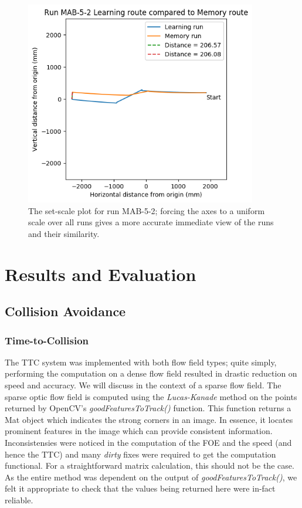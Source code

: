 \documentclass[a4paper,11pt,twoside,openright]{article}
\let\oldsection\section
\def\section{\cleardoublepage\oldsection}
\begin{document}
\begin{figure}
  \centering
  \includegraphics[width=0.9\textwidth]{MAB-5-2}
  \caption{\label{fig:setscalerun}The set-scale plot for run MAB-5-2; forcing the axes to a uniform scale over all runs gives a more accurate immediate
      view of the runs and their similarity.}
\end{figure}

\newpage

\section{ Results and Evaluation } \label{sec:results}
\subsection{Collision Avoidance}
\subsubsection{Time-to-Collision}
The TTC system was implemented with both flow field types; quite simply, performing the computation on a dense flow
field resulted in drastic reduction on speed and accuracy. We will discuss in the context of a sparse flow field. The
sparse optic flow field is computed using the \textit{Lucas-Kanade} method on the points returned by OpenCV's
\textit{goodFeaturesToTrack()} function. This function returns a Mat object which indicates the strong corners in an image.
In essence, it locates prominent features in the image which can provide consistent information. Inconsistensies
were noticed in the computation of the FOE and the speed (and hence the TTC) and many \textit{dirty} fixes were required to get the computation
functional. For a straightforward matrix calculation, this should not be the case. As the entire method was dependent on
the output of \textit{goodFeaturesToTrack()}, we felt it appropriate to check that the values being returned here were in-fact
reliable.
\end{document}
